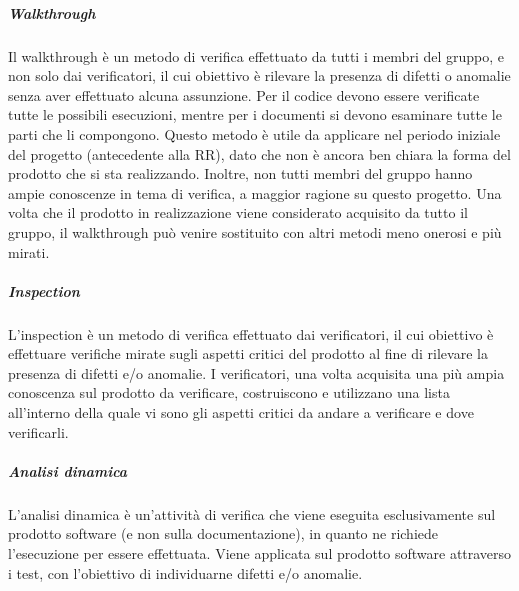 \subparagraph*{Walkthrough} 
Il walkthrough è un metodo di verifica effettuato da tutti i membri del gruppo, e non solo dai verificatori, il cui obiettivo è rilevare la presenza di difetti o anomalie senza aver effettuato alcuna assunzione.
Per il codice devono essere verificate tutte le possibili esecuzioni, mentre per i documenti si devono esaminare tutte le parti che li compongono.
Questo metodo è utile da applicare nel periodo iniziale del progetto (antecedente alla RR), dato che non è ancora ben chiara la forma del prodotto che si sta realizzando.
Inoltre, non tutti membri del gruppo hanno ampie conoscenze in tema di verifica, a maggior ragione su questo progetto. Una volta che il prodotto in realizzazione viene considerato acquisito da tutto il gruppo, il walkthrough può venire sostituito con altri metodi meno onerosi e più mirati.
\subparagraph*{Inspection}
L'inspection è un metodo di verifica effettuato dai verificatori, il cui obiettivo è effettuare verifiche mirate sugli aspetti critici del prodotto al fine di rilevare la presenza di difetti e/o anomalie.
I verificatori, una volta acquisita una più ampia conoscenza sul prodotto da verificare, costruiscono e utilizzano una lista all’interno della quale vi sono gli aspetti critici da andare a verificare e dove verificarli.

\subparagraph*{Analisi dinamica} 
L'analisi dinamica è un'attività di verifica che viene eseguita esclusivamente sul prodotto software (e non sulla documentazione), in quanto ne richiede l'esecuzione per essere effettuata.
Viene applicata sul prodotto software attraverso i test, con l’obiettivo di individuarne difetti e/o anomalie.

